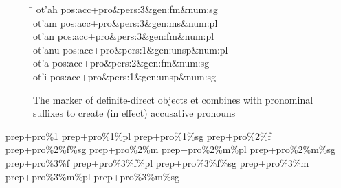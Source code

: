 \begin{figure}
\begin{tabbing}
\hspace{1in} \= \hspace{5.5in} \kill
{}ot\a'{a}h \> pos:acc+pro\&pers:3\&gen:fm\&num:sg\\
ot\a'{a}m \> pos:acc+pro\&pers:3\&gen:ms\&num:pl\\
ot\a'{a}n \> pos:acc+pro\&pers:3\&gen:fm\&num:pl\\
ot\a'{a}nu \> pos:acc+pro\&pers:1\&gen:unsp\&num:pl\\
ot\a'{a} \> pos:acc+pro\&pers:2\&gen:fm\&num:sg\\
ot\a'{i} \> pos:acc+pro\&pers:1\&gen:unsp\&num:sg\\
\end{tabbing}
\caption{The marker of definite-direct objects et combines with pronominal suffixes
to create (in effect) accusative pronouns}
\label{fig:acc-examples}
\end{figure}

	prep+pro\%1             
	prep+pro\%1\%pl          
	prep+pro\%1\%sg          
	prep+pro\%2\%f           
	prep+pro\%2\%f\%sg        
	prep+pro\%2\%m           
	prep+pro\%2\%m\%pl        
	prep+pro\%2\%m\%sg        
	prep+pro\%3\%f           
	prep+pro\%3\%f\%pl        
	prep+pro\%3\%f\%sg        
	prep+pro\%3\%m           
	prep+pro\%3\%m\%pl        
	prep+pro\%3\%m\%sg

